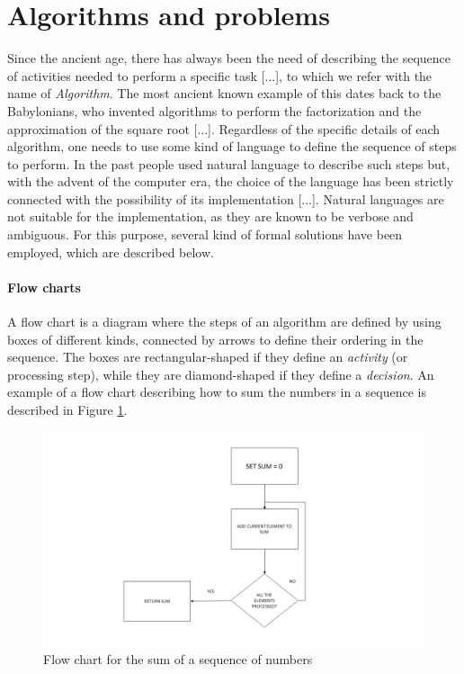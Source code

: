 \section{Algorithms and problems}
Since the ancient age, there has always been the need of describing the sequence of activities needed to perform a specific task [...], to which we refer with the name of \textit{Algorithm}. The most ancient known example of this dates back to the Babylonians, who invented algorithms to perform the factorization and the approximation of the square root [...]. Regardless of the specific details of each algorithm, one needs to use some kind of language  to define the sequence of steps to perform. In the past people used natural language to describe such steps but, with the advent of the computer era, the choice of the language has been strictly connected with the possibility of its implementation [...]. Natural languages are not suitable for the implementation, as they are known to be verbose and ambiguous. For this purpose, several kind of formal solutions have been employed, which are described below.

\paragraph{Flow charts}
A flow chart is a diagram where the steps of an algorithm are defined by using boxes of different kinds, connected by arrows to define their ordering in the sequence. The boxes are rectangular-shaped if they define an \textit{activity} (or processing step), while they are diamond-shaped if they define a \textit{decision}. An example of a flow chart describing how to sum the numbers in a sequence is described in Figure \ref{fig:ch1_flow_chart}.

\begin{figure}
	\centering
	\includegraphics[width = \textwidth]{Figures/flow_chart}
	\caption{Flow chart for the sum of a sequence of numbers}
	\label{fig:ch1_flow_chart}
\end{figure}

